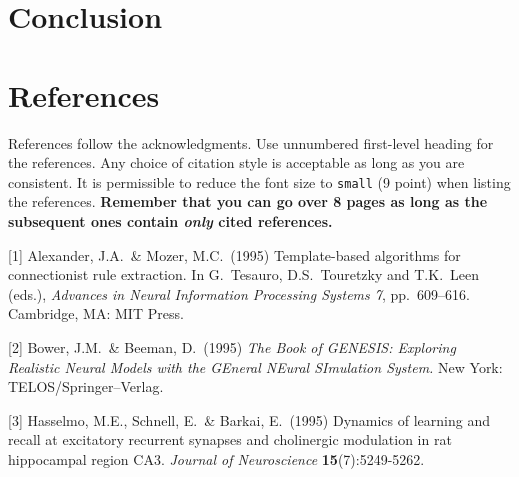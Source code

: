 \documentclass{article}
\begin{document}
\section{Conclusion}


\section*{References}

References follow the acknowledgments. Use unnumbered first-level
heading for the references. Any choice of citation style is acceptable
as long as you are consistent. It is permissible to reduce the font
size to \verb+small+ (9 point) when listing the references. {\bf
  Remember that you can go over 8 pages as long as the subsequent ones contain
  \emph{only} cited references.}
\medskip

\small

[1] Alexander, J.A.\ \& Mozer, M.C.\ (1995) Template-based algorithms
for connectionist rule extraction. In G.\ Tesauro, D.S.\ Touretzky and
T.K.\ Leen (eds.), {\it Advances in Neural Information Processing
  Systems 7}, pp.\ 609--616. Cambridge, MA: MIT Press.

[2] Bower, J.M.\ \& Beeman, D.\ (1995) {\it The Book of GENESIS:
  Exploring Realistic Neural Models with the GEneral NEural SImulation
  System.}  New York: TELOS/Springer--Verlag.

[3] Hasselmo, M.E., Schnell, E.\ \& Barkai, E.\ (1995) Dynamics of
learning and recall at excitatory recurrent synapses and cholinergic
modulation in rat hippocampal region CA3. {\it Journal of
  Neuroscience} {\bf 15}(7):5249-5262.
\end{document}
